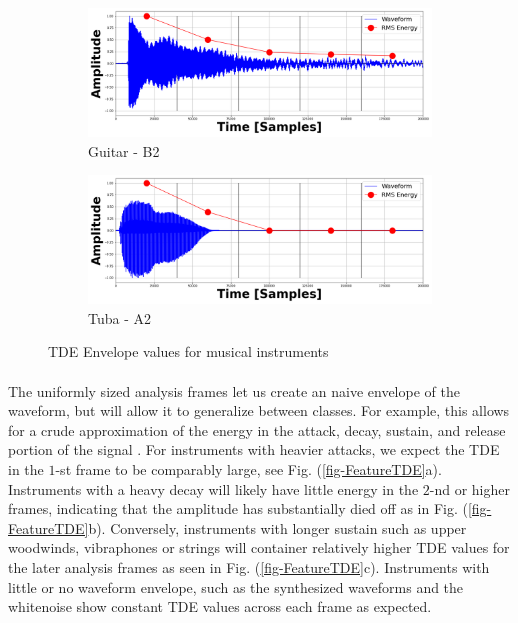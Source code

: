 \documentclass[12pt,letterpaper]{article}
\begin{document}
\begin{figure}[H]
	\begin{subfigure}[b]{0.45\textwidth}
	\begin{center}
	\includegraphics[width=1.0\linewidth]{../FiguresSpectrogram/GUITAR-B2_TDE}
	\caption{Guitar - B2}
	\end{center}
	\end{subfigure}	
	\hfill
	\begin{subfigure}[b]{0.45\textwidth}
	\begin{center}
	\includegraphics[width=1.0\linewidth]{../FiguresSpectrogram/Tuba-A2_TDE}
	\caption{Tuba - A2}
	\end{center}
	\end{subfigure}
	\caption{TDE Envelope values for musical instruments}
	\label{fig-ExampleTDE}
\end{figure}

\paragraph*{}The uniformly sized analysis frames let us create an naive envelope of the waveform, but will allow it to generalize between classes. For example, this allows for a crude approximation of the energy in the attack, decay, sustain, and release portion of the signal \cite{Virtanen,Olson}. For instruments with heavier attacks, we expect the TDE in the $1$-st frame to be comparably large, see Fig. (\ref{fig-FeatureTDE}a). Instruments with a heavy decay will likely have little energy in the $2$-nd or higher frames, indicating that the amplitude has substantially died off as in Fig. (\ref{fig-FeatureTDE}b). Conversely, instruments with longer sustain such as upper woodwinds, vibraphones or strings will container relatively higher TDE values for the later analysis frames as seen in Fig. (\ref{fig-FeatureTDE}c). Instruments with little or no waveform envelope, such as the synthesized waveforms and the whitenoise show constant TDE values across each frame as expected.
\end{document}
